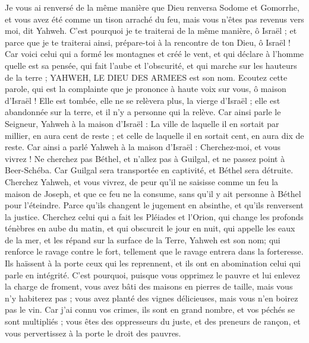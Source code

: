 \begin{multicols}{2}
Je vous ai renversé de la même manière que Dieu renversa Sodome et Gomorrhe, et vous avez été comme un tison arraché du feu, mais vous n'êtes pas revenus vers moi, dit Yahweh.
C'est pourquoi je te traiterai de la même manière, ô Israël ; et parce que je te traiterai ainsi, prépare-toi à la rencontre de ton Dieu, ô Israël !
Car voici celui qui a formé les montagnes et créé le vent, et qui déclare à l'homme quelle est sa pensée, qui fait l'aube et l'obscurité, et qui marche sur les hauteurs de la terre ; YAHWEH, LE DIEU DES ARMEES est son nom.
\VerseOne{}Ecoutez cette parole, qui est la complainte que je prononce à haute voix sur vous, ô maison d'Israël !
Elle est tombée, elle ne se relèvera plus, la vierge d'Israël ; elle est abandonnée sur la terre, et il n'y a personne qui la relève.
Car ainsi parle le Seigneur, Yahweh à la maison d'Israël : La ville de laquelle il en sortait par millier, en aura cent de reste ; et celle de laquelle il en sortait cent, en aura dix de reste.
Car ainsi a parlé Yahweh à la maison d'Israël : Cherchez-moi, et vous vivrez !
Ne cherchez pas Béthel, et n'allez pas à Guilgal, et ne passez point à Beer-Schéba. Car Guilgal sera transportée en captivité, et Béthel sera détruite.
Cherchez Yahweh, et vous vivrez, de peur qu'il ne saisisse comme un feu la maison de Joseph, et que ce feu ne la consume, sans qu'il y ait personne à Béthel pour l'éteindre.
Parce qu'ils changent le jugement en absinthe, et qu'ils renversent la justice.
Cherchez celui qui a fait les Pléiades et l'Orion, qui change les profonds ténèbres en aube du matin, et qui obscurcit le jour en nuit, qui appelle les eaux de la mer, et les répand sur la surface de la Terre, Yahweh est son nom;
qui renforce le ravage contre le fort, tellement que le ravage entrera dans la forteresse.
Ils haïssent à la porte ceux qui les reprennent, et ils ont en abomination celui qui parle en intégrité.
C'est pourquoi, puisque vous opprimez le pauvre et lui enlevez la charge de froment, vous avez bâti des maisons en pierres de taille, mais vous n'y habiterez pas ; vous avez planté des vignes délicieuses, mais vous n'en boirez pas le vin.
Car j'ai connu vos crimes, ils sont en grand nombre, et vos péchés se sont multipliés ; vous êtes des oppresseurs du juste, et des preneurs de rançon, et vous pervertissez à la porte le droit des pauvres. 

\end{multicols}
